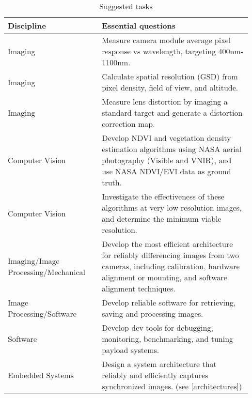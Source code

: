 \documentclass[conference]{IEEEtran} %
\begin{document}
\noindent
\begin{table}[h!]
  \label{tasks}
  \caption{Suggested tasks}
  \centering
\begin{tabularx}{\linewidth}{@{}lX@{}}
    \textbf{Discipline} & \textbf{Essential questions} \\
    \midrule
Imaging & Measure camera module average pixel response vs wavelength, targeting 400nm-1100nm. \\
Imaging & Calculate spatial resolution (GSD) from pixel density, field of view, and altitude. \\
Imaging & Measure lens distortion by imaging a standard target and generate a distortion correction map. \\
Computer Vision & Develop NDVI and vegetation density estimation algorithms using NASA aerial photography (Visible and VNIR), and use NASA NDVI/EVI data as ground truth. \\
Computer Vision & Investigate the effectiveness of these algorithms at very low resolution images, and determine the minimum viable resolution. \\
Imaging/Image Processing/Mechanical & Develop the most efficient architecture for reliably differencing images from two cameras, including calibration, hardware alignment or mounting, and software alignment techniques. \\
Image Processing/Software & Develop reliable software for retrieving, saving and processing images. \\
Software & Develop dev tools for debugging, monitoring, benchmarking, and tuning payload systems. \\
Embedded Systems & Design a system architecture that reliably and efficiently captures synchronized images. (see \autoref{architectures}) \\
\end{tabularx}
\end{table}
\end{document}
